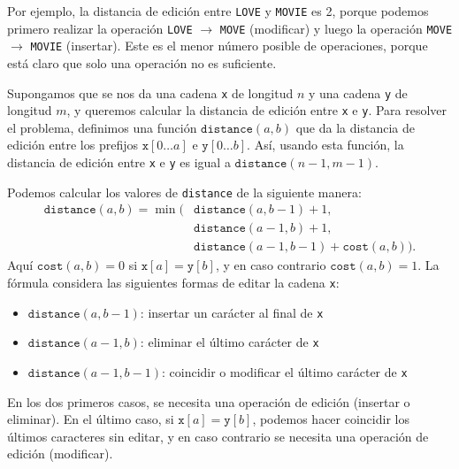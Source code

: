 Por ejemplo, la distancia de edición entre
\texttt{LOVE} y \texttt{MOVIE} es 2,
porque podemos primero realizar la operación
 \texttt{LOVE} $\rightarrow$ \texttt{MOVE}
(modificar) y luego la operación
\texttt{MOVE} $\rightarrow$ \texttt{MOVIE}
(insertar).
Este es el menor número posible de operaciones,
porque está claro que solo una operación no es suficiente.

Supongamos que se nos da una cadena \texttt{x}
de longitud $n$ y una cadena \texttt{y} de longitud $m$,
y queremos calcular la distancia de edición entre
\texttt{x} e \texttt{y}.
Para resolver el problema, definimos una función
$\texttt{distance}(a,b)$ que da la
distancia de edición entre los prefijos
$\texttt{x}[0 \ldots a]$ e $\texttt{y}[0 \ldots b]$.
Así, usando esta función, la distancia de edición
entre \texttt{x} e \texttt{y} es igual a $\texttt{distance}(n-1,m-1)$.

Podemos calcular los valores de \texttt{distance}
de la siguiente manera:
\begin{equation*}
\begin{split}
\texttt{distance}(a,b) = \min(& \texttt{distance}(a,b-1)+1, \\
                           & \texttt{distance}(a-1,b)+1, \\
                           & \texttt{distance}(a-1,b-1)+\texttt{cost}(a,b)).
\end{split}
\end{equation*}
Aquí $\texttt{cost}(a,b)=0$ si $\texttt{x}[a]=\texttt{y}[b]$,
y en caso contrario $\texttt{cost}(a,b)=1$.
La fórmula considera las siguientes formas de
editar la cadena \texttt{x}:
\begin{itemize}
\item $\texttt{distance}(a,b-1)$: insertar un carácter al final de \texttt{x}
\item $\texttt{distance}(a-1,b)$: eliminar el último carácter de \texttt{x}
\item $\texttt{distance}(a-1,b-1)$: coincidir o modificar el último carácter de \texttt{x}
\end{itemize}
En los dos primeros casos, se necesita una operación de edición
(insertar o eliminar).
En el último caso, si $\texttt{x}[a]=\texttt{y}[b]$,
podemos hacer coincidir los últimos caracteres sin editar,
y en caso contrario se necesita una operación de edición (modificar).

